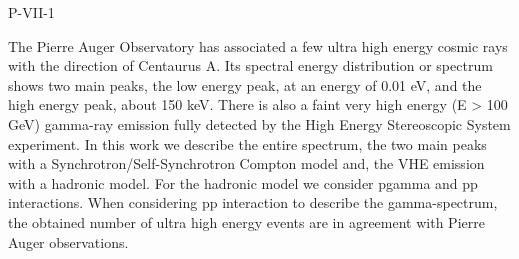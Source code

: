 P-VII-1


\bigskip



\bigskip

\noindent The Pierre Auger Observatory has associated a few ultra high energy cosmic rays  with the direction of Centaurus A. Its spectral energy distribution or spectrum shows two main peaks, the low energy peak, at an energy of  0.01 eV,  and the high energy peak, about 150 keV. There is also a faint very high energy (E > 100 GeV) gamma-ray emission fully detected by the High Energy Stereoscopic System experiment.  In this work  we describe the entire spectrum, the two main peaks with a Synchrotron/Self-Synchrotron Compton model and, the VHE emission with a hadronic model.  For the hadronic model we consider pgamma and pp interactions. When considering  pp interaction to describe the gamma-spectrum, the obtained number of ultra high energy events are in agreement with Pierre Auger observations.
